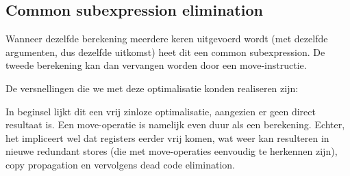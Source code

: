 \documentclass[a4paper,10pt]{article}
\begin{document}
\subsection{Common subexpression elimination}
Wanneer dezelfde berekening meerdere keren uitgevoerd wordt (met dezelfde
argumenten, dus dezelfde uitkomst) heet dit een common subexpression. De 
tweede berekening kan dan vervangen worden door een move-instructie.

De versnellingen die we met deze optimalisatie konden realiseren zijn:

In beginsel lijkt dit een vrij zinloze optimalisatie, aangezien er geen 
direct resultaat is. Een move-operatie is namelijk even duur als een
berekening. Echter, het impliceert wel dat registers eerder vrij komen, wat
weer kan resulteren in nieuwe redundant stores (die met move-operaties
eenvoudig te herkennen zijn), copy propagation en vervolgens dead code
elimination.
\end{document}

